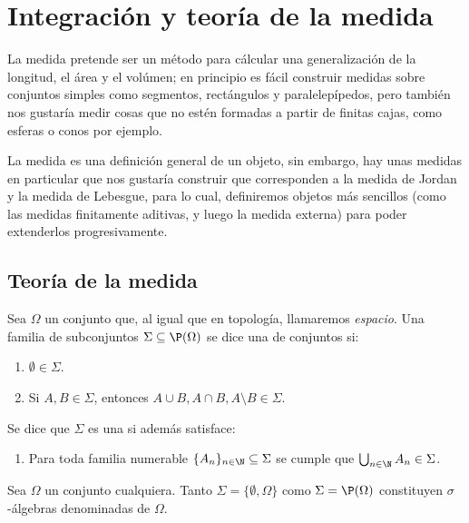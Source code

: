 \chapter{Integración y teoría de la medida}
La medida pretende ser un método para cálcular una generalización de la longitud, el área y el volúmen;
en principio es fácil construir medidas sobre conjuntos simples como segmentos, rectángulos y paralelepípedos,
pero también nos gustaría medir cosas que no estén formadas a partir de finitas cajas, como esferas o conos por ejemplo.

La medida es una definición general de un objeto, sin embargo, hay unas medidas en particular que nos gustaría construir que corresponden
a la medida de Jordan y la medida de Lebesgue, para lo cual, definiremos objetos más sencillos
(como las medidas finitamente aditivas, y luego la medida externa) para poder extenderlos progresivamente.

\section{Teoría de la medida}
\begin{mydef}
	Sea $\Omega$ un conjunto que, al igual que en topología, llamaremos \textit{espacio}.
	Una familia de subconjuntos $\Sigma \subseteq \P(\Omega)$ se dice una 
	de conjuntos si:
	\begin{enumerate}[{ALG}1.]
		\item $\emptyset \in \Sigma$.
		\item Si $A, B \in \Sigma$, entonces $A\cup B, A\cap B, A\setminus B \in \Sigma$.
	\end{enumerate}
	Se dice que $\Sigma$ es una  si además satisface:
	\begin{enumerate}[resume*]
		\item Para toda familia numerable $\{ A_n \}_{n\in\N} \subseteq \Sigma$ se cumple que $\bigcup_{n\in\N} A_n \in \Sigma$.
	\end{enumerate}
\end{mydef}
\begin{ex}
	Sea $\Omega$ un conjunto cualquiera.
	Tanto $\Sigma = \{ \emptyset, \Omega \}$ como $\Sigma = \P(\Omega)$ constituyen $\sigma$-álgebras denominadas  de $\Omega$.
\end{ex}

